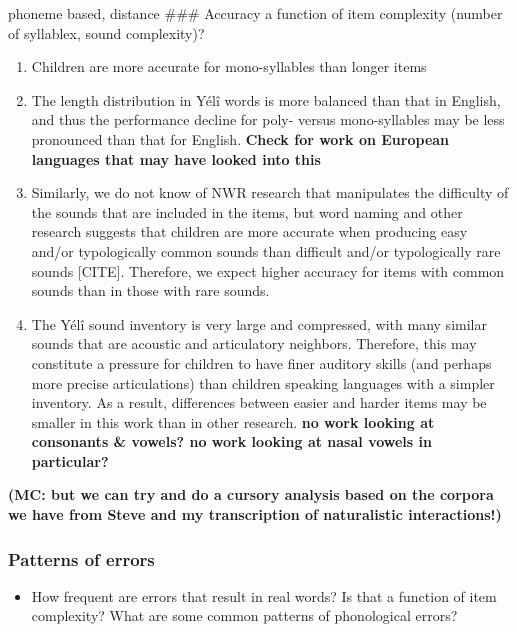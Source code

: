 \documentclass[english,,man,floatsintext]{apa6}
\providecommand{\tightlist}{%
  \setlength{\itemsep}{0pt}\setlength{\parskip}{0pt}}
\begin{document}
phoneme based, distance
\#\#\# Accuracy a function of item complexity
(number of syllablex, sound complexity)?

\begin{enumerate}
\def\labelenumi{\arabic{enumi}.}
\item
  Children are more accurate for mono-syllables than longer items
\item
  The length distribution in Yélî words is more balanced than that in English, and thus the performance decline for poly- versus mono-syllables may be less pronounced than that for English. \textbf{Check for work on European languages that may have looked into this}
\item
  Similarly, we do not know of NWR research that manipulates the difficulty of the sounds that are included in the items, but word naming and other research suggests that children are more accurate when producing easy and/or typologically common sounds than difficult and/or typologically rare sounds {[}CITE{]}. Therefore, we expect higher accuracy for items with common sounds than in those with rare sounds.
\item
  The Yélî sound inventory is very large and compressed, with many similar sounds that are acoustic and articulatory neighbors. Therefore, this may constitute a pressure for children to have finer auditory skills (and perhaps more precise articulations) than children speaking languages with a simpler inventory. As a result, differences between easier and harder items may be smaller in this work than in other research. \textbf{no work looking at consonants \& vowels? no work looking at nasal vowels in particular?}
\end{enumerate}

\textbf{(MC: but we can try and do a cursory analysis based on the corpora we have from Steve and my transcription of naturalistic interactions!)}

\hypertarget{patterns-of-errors}{%
\subsubsection{Patterns of errors}\label{patterns-of-errors}}

\begin{itemize}
\tightlist
\item
  How frequent are errors that result in real words? Is that a function of item complexity? What are some common patterns of phonological errors?
\end{itemize}
\end{document}
